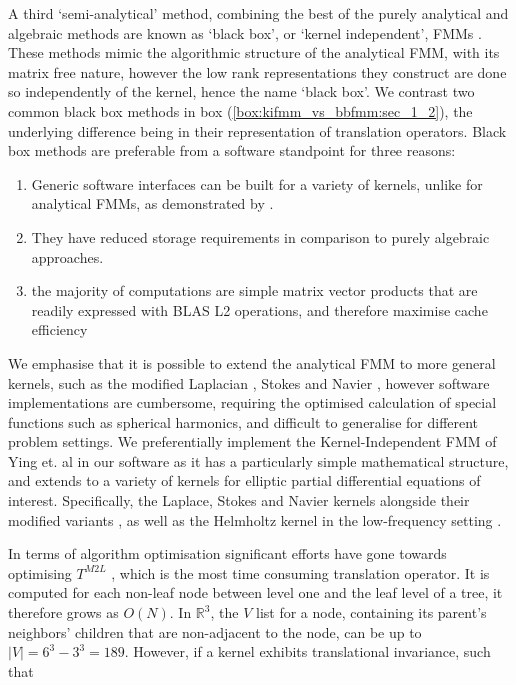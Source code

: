 A third `semi-analytical' method, combining the best of the purely analytical and algebraic methods are known as `black box', or `kernel independent', \gls{FMM}s \cite{Ying:2004:JCP,fong2009black,martinsson2007accelerated}. These methods mimic the algorithmic structure of the analytical FMM, with its matrix free nature, however the low rank representations they construct are done so independently of the kernel, hence the name `black box'. We contrast two common black box methods in box (\ref{box:kifmm_vs_bbfmm:sec_1_2}), the underlying difference being in their representation of translation operators. Black box methods are preferable from a software standpoint for three reasons:

\begin{enumerate}
    \item Generic software interfaces can be built for a variety of kernels, unlike for analytical FMMs, as demonstrated by \cite{wang2021exafmm,kailasa2022pyexafmm}.
    \item They have reduced storage requirements in comparison to purely algebraic approaches.
    \item the majority of computations are simple matrix vector products that are readily expressed with BLAS L2 operations, and therefore maximise cache efficiency
\end{enumerate}

We emphasise that it is possible to extend the analytical FMM to more general kernels, such as the modified Laplacian \cite{greengard2002new}, Stokes \cite{fu2000fast} and Navier \cite{fu1998fast}, however software implementations are cumbersome, requiring the optimised calculation of special functions such as spherical harmonics, and difficult to generalise for different problem settings. We preferentially implement the Kernel-Independent \gls{FMM} of Ying et. al \cite{Ying:2004:JCP} in our software \cite{kailasa2022pyexafmm} as it has a particularly simple mathematical structure, and extends to a variety of kernels for elliptic partial differential equations of interest. Specifically, the Laplace, Stokes and Navier kernels alongside their modified variants \cite{Ying:2004:JCP}, as well as the Helmholtz kernel in the low-frequency setting \cite{wang2021exafmm}. 

In terms of algorithm optimisation significant efforts have gone towards optimising $T^{M2L}$ \cite{messner2012optimized,fong2009black,Ying:2004:JCP}, which is the most time consuming translation operator. It is computed for each non-leaf node between level one and the leaf level of a tree, it therefore grows as $O(N)$. In $\mathbb{R}^3$, the $V$ list for a node, containing its parent’s neighbors' children that are non-adjacent to the node, can be up to $|V| = 6^3 - 3^3=189$. However, if a kernel exhibits translational invariance, such that

